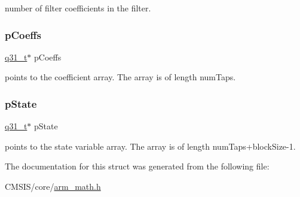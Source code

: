number of filter coefficients in the filter. \mbox{\label{structarm__fir__instance__q31_a68888e36167d81cb7836db10367a1682}} 
\subsubsection{\texorpdfstring{pCoeffs}{pCoeffs}}
{\footnotesize\ttfamily \mbox{\hyperlink{arm__math_8h_adc89a3547f5324b7b3b95adec3806bc0}{q31\+\_\+t}}$\ast$ p\+Coeffs}

points to the coefficient array. The array is of length num\+Taps. \mbox{\label{structarm__fir__instance__q31_adee4ba3ee8869865af7d8fa08ca913d6}} 
\subsubsection{\texorpdfstring{pState}{pState}}
{\footnotesize\ttfamily \mbox{\hyperlink{arm__math_8h_adc89a3547f5324b7b3b95adec3806bc0}{q31\+\_\+t}}$\ast$ p\+State}

points to the state variable array. The array is of length num\+Taps+block\+Size-\/1. 

The documentation for this struct was generated from the following file\+:\begin{DoxyCompactItemize}
\item 
C\+M\+S\+I\+S/core/\mbox{\hyperlink{arm__math_8h}{arm\+\_\+math.\+h}}\end{DoxyCompactItemize}
